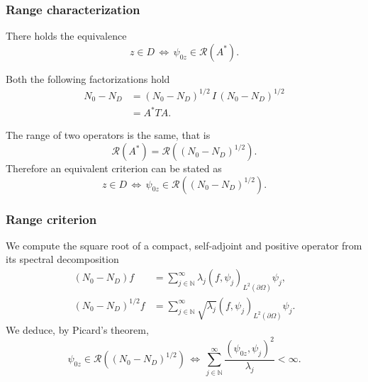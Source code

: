 \documentclass[10pt]{beamer}
\theoremstyle{plain}
\theoremstyle{plain}
\begin{document}
\begin{frame}
 \frametitle{Range characterization}
\begin{theorem}
 There holds the equivalence 
 \begin{equation}
  z \in D \,\Longleftrightarrow \,\psi_{0z} \in \mathcal{R}(A^*).
 \end{equation}
\end{theorem}
Both the following factorizations hold
\begin{align*}
\label{eq:factorization-two}
 {N_0} - {N_D}&=({N_0} - {N_D})^{1/2}\,I\,({N_0} - {N_D})^{1/2}\\
 &= A^*TA.
\end{align*}
\vspace{-0.8cm}
 \begin{theorem}
 The range of two operators is the same, that is
 \begin{equation}
  \mathcal{R}(A^*) = \mathcal{R}(({N_0} - {N_D})^{1/2}).
 \end{equation}
Therefore an equivalent criterion can be stated as
 \begin{equation}
  z \in D \,\Longleftrightarrow \,\psi_{0z} \in \mathcal{R}(({N_0} - {N_D})^{1/2}).
 \end{equation}
\end{theorem}
\end{frame}
\begin{frame}
 \frametitle{Range criterion}
We compute the square root of a
compact, self-adjoint and positive operator 
from its spectral decomposition
\begin{align}
({N_0} - {N_D}) f &= \sum_{j\in \mathbb{N}}^\infty \lambda_j(f,\psi_j)_{L^2(\partial\Omega)} \psi_j ,\\
({N_0} - {N_D})^{1/2} f &= \sum_{j\in \mathbb{N}}^\infty \sqrt{\lambda_j}(f,\psi_j)_{L^2(\partial\Omega)} \psi_j.
\end{align}
We deduce, by Picard's theorem,
\begin{equation}
   \psi_{0z} \in \mathcal{R}(({N_0} - {N_D})^{1/2})
   \,\Longleftrightarrow \,
   \sum_{j\in \mathbb{N}}^\infty \frac{(\psi_{0z},\psi_j)^2}{\lambda_j}<\infty. 
\end{equation}
\end{frame}
\end{document}
